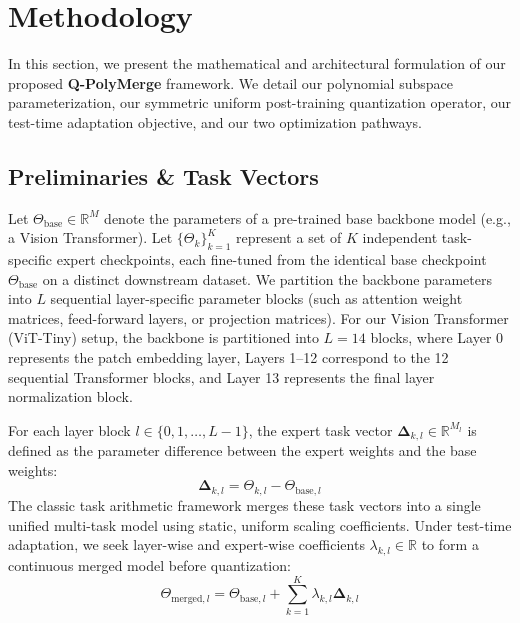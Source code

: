 \section{Methodology}
\label{sec:method}

In this section, we present the mathematical and architectural formulation of our proposed \textbf{Q-PolyMerge} framework. We detail our polynomial subspace parameterization, our symmetric uniform post-training quantization operator, our test-time adaptation objective, and our two optimization pathways.

\subsection{Preliminaries \& Task Vectors}
Let $\Theta_{\text{base}} \in \mathbb{R}^M$ denote the parameters of a pre-trained base backbone model (e.g., a Vision Transformer). Let $\{\Theta_k\}_{k=1}^K$ represent a set of $K$ independent task-specific expert checkpoints, each fine-tuned from the identical base checkpoint $\Theta_{\text{base}}$ on a distinct downstream dataset. We partition the backbone parameters into $L$ sequential layer-specific parameter blocks (such as attention weight matrices, feed-forward layers, or projection matrices). For our Vision Transformer (ViT-Tiny) setup, the backbone is partitioned into $L=14$ blocks, where Layer 0 represents the patch embedding layer, Layers 1--12 correspond to the 12 sequential Transformer blocks, and Layer 13 represents the final layer normalization block. 

For each layer block $l \in \{0, 1, \dots, L-1\}$, the expert task vector $\mathbf{\Delta}_{k, l} \in \mathbb{R}^{M_l}$ is defined as the parameter difference between the expert weights and the base weights:
\begin{equation}
\mathbf{\Delta}_{k, l} = \Theta_{k, l} - \Theta_{\text{base}, l}
\end{equation}
The classic task arithmetic framework \cite{ilharco2022editing} merges these task vectors into a single unified multi-task model using static, uniform scaling coefficients. Under test-time adaptation, we seek layer-wise and expert-wise coefficients $\lambda_{k, l} \in \mathbb{R}$ to form a continuous merged model before quantization:
\begin{equation}
\label{eq:continuous_merge}
\Theta_{\text{merged}, l} = \Theta_{\text{base}, l} + \sum_{k=1}^K \lambda_{k, l} \mathbf{\Delta}_{k, l}
\end{equation}

